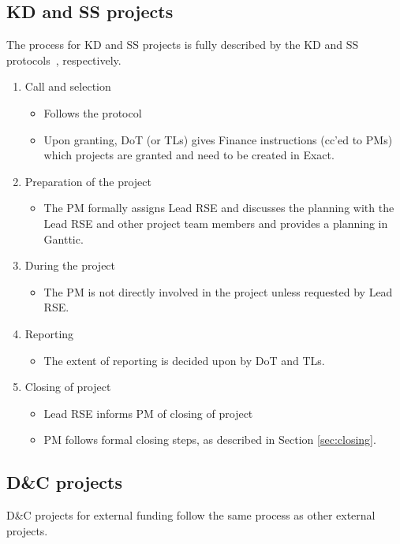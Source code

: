 \subsection{KD and SS projects}
The process for KD and SS projects is fully described by the KD and SS protocols~\cite{kd-intranet,ss-intranet}, respectively.
\begin{enumerate}[label=\arabic*.,ref=\arabic*]
\item Call and selection
\begin{itemize}
\item Follows the protocol
\item Upon granting, DoT (or TLs) gives Finance instructions (cc'ed to PMs) which
projects are granted and need to be created in Exact.
\end{itemize}
\item Preparation of the project
\begin{itemize}
\item The PM formally assigns Lead RSE and discusses the planning with the Lead RSE and other
project team members and provides a planning in Ganttic.
\end{itemize}
\item During the project
\begin{itemize}
\item The PM is not directly involved in the project unless requested by Lead RSE.
\end{itemize}
\item Reporting
\begin{itemize}
\item The extent of reporting is decided upon by DoT and TLs.
\end{itemize}
\item Closing of project
\begin{itemize}
\item Lead RSE informs PM of closing of project
\item PM follows formal closing steps, as described in Section \ref{sec:closing}.
\end{itemize}
\end{enumerate}

\subsection{D\&C projects}
D\&C projects for external funding follow the same process as other external projects.

